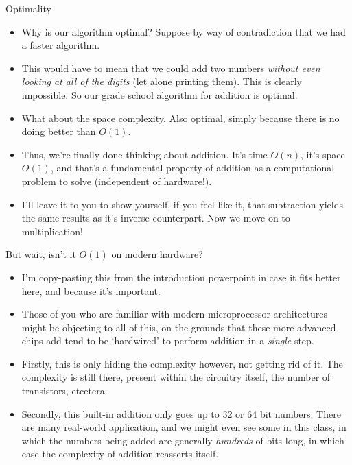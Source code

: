 \documentclass{beamer}
\begin{document}
\begin{frame}{Optimality}
    \begin{itemize}
        \item Why is our algorithm optimal? Suppose by way of contradiction that we had a faster algorithm. 
        \pause
        \item This would have to mean that we could add two numbers \emph{without even looking at all of the digits} (let alone printing them). This is clearly impossible. So our grade school algorithm for addition is optimal. 
        \pause
        \item What about the space complexity. Also optimal, simply because there is no doing better than $O(1)$.
        \item Thus, we're finally done thinking about addition. It's time $O(n)$, it's space $O(1)$, and that's a fundamental property of addition as a computational problem to solve (independent of hardware!). 
        \item I'll leave it to you to show yourself, if you feel like it, that subtraction yields the same results as it's inverse counterpart. Now we move on to multiplication! 
    \end{itemize}
\end{frame}

\begin{frame}{But wait, isn't it $O(1)$ on modern hardware?}
    \begin{itemize}
        \item I'm copy-pasting this from the introduction powerpoint in case it fits better here, and because it's important.
        \item Those of you who are familiar with modern microprocessor architectures might be objecting to all of this, on the grounds that these more advanced chips add tend to be `hardwired' to perform addition in a \emph{single} step. 
        \pause
        \item Firstly, this is only hiding the complexity however, not getting rid of it. The complexity is still there, present within the circuitry itself, the number of transistors, etcetera. 
        \pause
        \item Secondly, this built-in addition only goes up to 32 or 64 bit numbers. There are many real-world application, and we might even see some in this class, in which the numbers being added are generally \emph{hundreds} of bits long, in which case the complexity of addition reasserts itself. 
    \end{itemize}
\end{frame}
\end{document}
